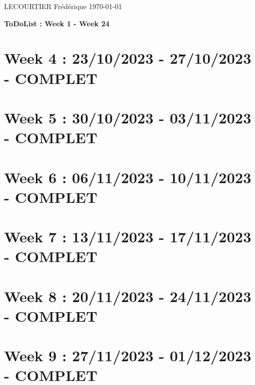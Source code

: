 \documentclass{article}
\begin{document}
	LECOURTIER Frédérique \hfill \today
	\begin{center}
		\Large\textbf{{ToDoList : Week 1 - Week 24}}
	\end{center}
	\tableofcontents

	\newpage

	\section*{Week 4 : 23/10/2023 - 27/10/2023 - COMPLET}
	

	\newpage

	\section*{Week 5 : 30/10/2023 - 03/11/2023 - COMPLET}
	

	\newpage

	\section*{Week 6 : 06/11/2023 - 10/11/2023 - COMPLET}
	

	\newpage

	\section*{Week 7 : 13/11/2023 - 17/11/2023 - COMPLET}
	

	\newpage

	\section*{Week 8 : 20/11/2023 - 24/11/2023 - COMPLET}
	

	\newpage

	\section*{Week 9 : 27/11/2023 - 01/12/2023 - COMPLET}
	
\end{document}
